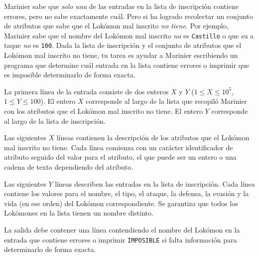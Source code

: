 \documentclass{oci}
\begin{document}
\begin{problemDescription}
Marinier sabe que \emph{solo una} de las entradas en la lista de inscripción
contiene errores, pero no sabe exactamente cuál.
Pero si ha logrado recolectar un conjunto de atributos que sabe que el Lokómon mal inscrito
\emph{no tiene}.
Por ejemplo, Marinier sabe que el nombre del Lokómon mal inscrito \emph{no} es \texttt{Castillo}
o que su a taque \emph{no} es \texttt{100}.
Dada la lista de inscripción y el conjunto de atributos que el Lokómon
mal inscrito no tiene, tu tarea es ayudar a Marinier escribiendo un programa que determine
cuál entrada en la lista contiene errores o imprimir que es imposible determinarlo de forma
exacta.
\end{problemDescription}

\begin{inputDescription}
La primera línea de la entrada consiste de dos enteros $X$ y $Y$
($1 \leq X \leq 10^5$, $1 \leq Y \leq 100$).
El entero $X$ corresponde al largo de la lista que recopiló Marinier con los atributos
que el Lokómon mal inscrito no tiene.
El entero $Y$ corresponde al largo de la lista de inscripción.

Las siguientes $X$ líneas contienen la descripción de los atributos que el Lokómon mal
inscrito no tiene.
Cada línea comienza con un carácter identificador de atributo seguido del valor para el atributo,
el que puede ser un entero o una cadena de texto dependiendo del atributo.

Las siguientes $Y$ líneas describen las entradas en la lista de inscripción.
Cada línea contiene los valores para el nombre, el tipo, el ataque, la defensa,
la evasión y la vida (en ese orden) del Lokómon correspondiente.
Se garantiza que todos los Lokómones en la lista tienen un nombre distinto.
\end{inputDescription}

\begin{outputDescription}
La salida debe contener una línea contendiendo el nombre del Lokómon en la entrada
que contiene errores o imprimir \texttt{IMPOSIBLE} si falta información para determinarlo
de forma exacta.
\end{outputDescription}

\begin{sampleDescription}
\end{sampleDescription}
\end{document}
